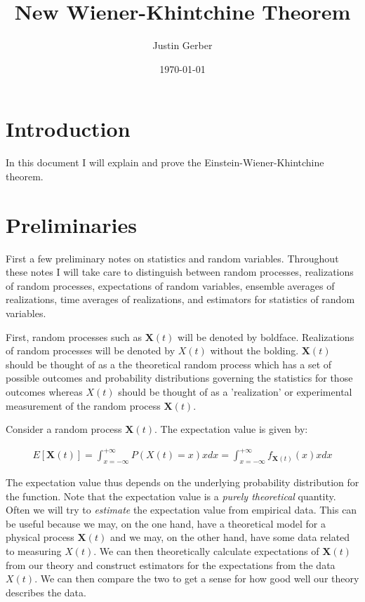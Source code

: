 \documentclass[12pt]{article}
\newcommand{\bv}[1]{\boldsymbol{#1}}
\begin{document}
\title{New Wiener-Khintchine Theorem}
\author{Justin Gerber}
\date{\today}
\maketitle

\section{Introduction}
In this document I will explain and prove the Einstein-Wiener-Khintchine theorem.

\section{Preliminaries}

First a few preliminary notes on statistics and random variables. Throughout these notes I will take care to distinguish between random processes, realizations of random processes, expectations of random variables, ensemble averages of realizations, time averages of realizations, and estimators for statistics of random variables.

First, random processes such as $\bv{X}(t)$ will be denoted by boldface. Realizations of random processes will be denoted by $X(t)$ without the bolding. $\bv{X}(t)$ should be thought of as a the theoretical random process which has a set of possible outcomes and probability distributions governing the statistics for those outcomes whereas $X(t)$ should be thought of as a 'realization' or experimental measurement of the random process $\bv{X}(t)$.

Consider a random process $\bv{X}(t)$. The expectation value is given by:

\begin{align}
E[\bv{X}(t)] = \int_{x=-\infty}^{+\infty} P(X(t)=x) x dx = \int_{x=-\infty}^{+\infty} f_{\bv{X}(t)}(x) x dx
\end{align}

The expectation value thus depends on the underlying probability distribution for the function. Note that the expectation value is a \textit{purely theoretical} quantity. Often we will try to \textit{estimate} the expectation value from empirical data. This can be useful because we may, on the one hand, have a theoretical model for a physical process $\bv{X}(t)$ and we may, on the other hand, have some data related to measuring $X(t)$. We can then theoretically calculate expectations of $\bv{X}(t)$ from our theory and construct estimators for the expectations from the data $X(t)$. We can then compare the two to get a sense for how good well our theory describes the data.
\end{document}
